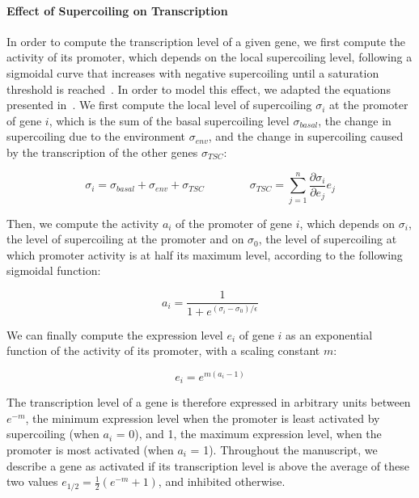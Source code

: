 \paragraph{Effect of Supercoiling on Transcription}
In order to compute the transcription level of a given gene, we first compute the activity of its promoter, which depends on the local supercoiling level, following a sigmoidal curve that increases with negative supercoiling until a saturation threshold is reached~\citep{forquet2021}.
In order to model this effect, we adapted the equations presented in~\cite{elhoudaigui2019}.
We first compute the local level of supercoiling $\sigma_i$ at the promoter of gene $i$, which is the sum of the basal supercoiling level $\sigma_{basal}$, the change in supercoiling due to the environment $\sigma_{env}$, and the change in supercoiling caused by the transcription of the other genes $\sigma_{TSC}$:

\begin{equation}
  \sigma_i = \sigma_{basal} + \sigma_{env} + \sigma_{TSC} \qquad \qquad \sigma_{TSC} = \sum_{j=1}^n\frac{\partial\sigma_{i}}{\partial e_j}e_j
  \label{eq:plos_sigma}
\end{equation}

Then, we compute the activity $a_i$ of the promoter of gene $i$, which depends on $\sigma_i$, the level of supercoiling at the promoter and on $\sigma_0$, the level of supercoiling at which promoter activity is at half its maximum level, according to the following sigmoidal function:

\begin{equation}
  a_i = \frac{1}{1 + e^{(\sigma_i - \sigma_0)/\epsilon}}
  \label{eq:prom_activity}
\end{equation}

We can finally compute the expression level $e_i$ of gene $i$ as an exponential function of the activity of its promoter, with a scaling constant $m$:

\begin{equation}
  e_i = e^{m (a_i - 1)}
  \label{eq:gene_activity}
\end{equation}

The transcription level of a gene is therefore expressed in arbitrary units between $e^{-m}$, the minimum expression level when the promoter is least activated by supercoiling (when $a_i$ = 0), and 1, the maximum expression level, when the promoter is most activated (when $a_i$ = 1).
Throughout the manuscript, we describe a gene as activated if its transcription level is above the average of these two values $e_{1/2} = \frac{1}{2}(e^{-m} + 1)$, and inhibited otherwise.


